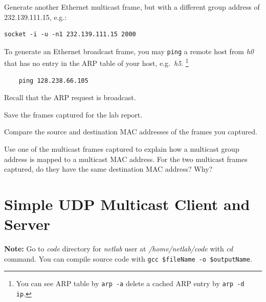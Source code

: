 \documentclass{UTNetLab}
\begin{document}
    Generate another Ethernet multicast frame, but with a different group address of {232.139.111.15}, e.g.:

    \begin{lstlisting}[emph={your-host, remote-host}]
    socket -i -u -n1 232.139.111.15 2000
    \end{lstlisting}


    To generate an Ethernet broadcast frame, you may \lstinline{ping} a remote host from \textit{h0} that has no entry in the ARP table of your host, e.g.\ \textit{h5}.
    \footnote{You can see ARP table by \lstinline{arp -a} delete a cached ARP entry by \lstinline[emph={ip}]{arp -d ip}.}

    \begin{lstlisting}
	ping 128.238.66.105
    \end{lstlisting}
    Recall that the ARP request is broadcast.%

    Save the frames captured for the lab report.

    \begin{report}
        \item Compare the source and destination MAC addresses of the frames you captured.

        \item Use one of the multicast frames captured to explain how a multicast group address is mapped to a multicast MAC address.
            For the two multicast frames captured, do they have the same destination MAC address?
            Why?
    \end{report}

\section{Simple UDP Multicast Client and Server}

    
    
\textbf{Note: }Go to \textit{code} directory for \textit{netlab} user at \textit{/home/netlab/code} with \textit{cd} command.
You can compile source code with \lstinline[emph={$fileName, $outputName}]{gcc $fileName -o $outputName}{}.
\end{document}
